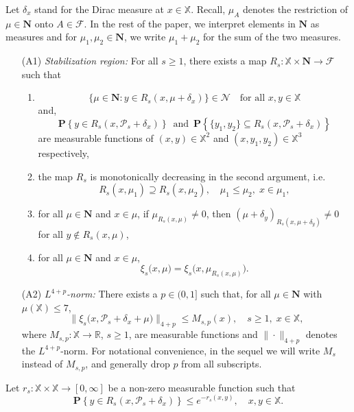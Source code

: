 \documentclass[11pt,reqno]{amsart}
\numberwithin{equation}{section}
\theoremstyle{definition}
\newcommand{\R}{\mathbb{R}}
\newcommand{\M}{\mu}
\newcommand{\sP}{\mathcal{P}}
\newcommand{\Prob}[1]{\mathbf P\left\{#1\right\}}
\newcommand{\XX}{\mathbb{X}}
\newcommand{\F}{\mathcal{F}}
\newcommand{\Nb}{\mathbf{N}}
\begin{document}
Let $\delta_x$ stand for the Dirac
measure at $x\in\XX$. Recall, $\mu_A$ denotes the restriction of $\mu \in \Nb$ onto $A \in \F$. In the rest of the paper, we interpret elements in $\Nb$ as measures and for $\mu_1, \mu_2 \in \Nb$, we write $\mu_1 + \mu_2$ for the sum of the two measures.
\begin{enumerate}
	\item[(A1)] \textit{Stabilization region:} For all $s \ge 1$, there
	exists a map $R_s:\XX \times \Nb\to \F$ such that
	\begin{enumerate}[(1)]
		\item $$
		\{\mu \in \Nb : y\in R_s(x, \M+\delta_x)\} \in \mathscr{N}
		\quad \text{for all $x,y \in \XX$}
		$$
		and,
		$$
		\Prob{y\in R_s(x, \sP_s+\delta_x)}\, \text{ and } \,
		\Prob{\{y_1, y_2\}\subseteq  R_s(x, \sP_s+\delta_x)}
		$$
		are measurable functions of $(x,y) \in \XX^2$ and
		$(x,y_1,y_2) \in \XX^3$ respectively,
		\item the map $R_s$ is monotonically decreasing in the second argument,
		i.e.\
		$$
		R_s(x,\M_1) \supseteq R_s(x,\M_2),
		\quad \M_1 \leq \M_2,\; x\in\M_1,
		$$ 
		\item for all $\mu\in\Nb$ and $x\in\mu$, if $\mu_{R_s(x,\mu)} \neq 0$, then $(\mu+\delta_y)_{R_s(x,\mu +\delta_y)} \neq 0$ for all
		$y \notin R_s(x,\mu)$,  
		\item for all $\M\in\Nb$ and $x\in\M$,
		\begin{displaymath}
			\xi_{s}\big(x,\M\big)
			=\xi_{s}\big(x,\M_{R_{s}(x,\M)}\big).
		\end{displaymath}
	\end{enumerate}
\end{enumerate}

\begin{enumerate}
	\item[(A2)] \textit{$L^{4+p}$-norm:} There exists a $p \in (0,1]$
	such that, for all $\mu\in\Nb$ with $\mu(\XX) \le 7$,
	\begin{displaymath}
	\Big\|\xi_{s}\big(x, \sP_{s}+\delta_x+\mu\big)\Big\|_{4+p}
	\leq M_{s,p}(x), \quad s\geq1,\; x \in \XX,
	\end{displaymath}
	where $M_{s,p} : \XX \to \R$, $s\geq1$, are measurable
	functions and $\|\cdot\|_{4+p}$ denotes the $L^{4+p}$-norm. For notational convenience, in the sequel we will write $M_s$
	instead of $M_{s,p}$, and generally drop $p$ from all subscripts.
\end{enumerate}

Let $r_{s}: \XX \times \XX \to [0,\infty]$ be a non-zero measurable
	function such that
	\begin{equation}
	\label{eq:Rs}
	\Prob{y \in R_s(x, \sP_s +\delta_x)} \le  e^{-r_{s}(x,y)}, \quad x, y \in \XX.
	\end{equation}
\end{document}
